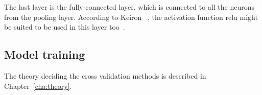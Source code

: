 The last layer is the fully-connected layer, which is connected to all the neurons from the pooling layer. According to Keiron ~\cite{introduction-to-cnn}, the activation function \gls{relu} might be suited to be used in this layer too~\cite{lecun-mnist-database}.

\subsection{Model training}\label{subsec:model-training}
The theory deciding the cross validation methods is described in Chapter~\ref{cha:theory}.



  
  
  
  
  
  


  
  
  
  
  
  



